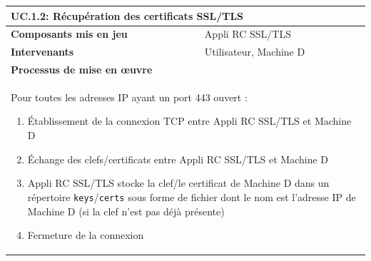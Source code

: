 \documentclass[a4paper,11pt,french]{article}
\begin{document}
\begin{center}

	\begin{tabularx}{16cm}{|l|X|}
	\hline
	\multicolumn{2}{|l|}{\textbf{UC.1.2: Récupération des certificats SSL/TLS}}\\
	\hline
	\textbf{Composants mis en jeu} & Appli RC SSL/TLS\\
	\hline
	\textbf{Intervenants} & Utilisateur, Machine D\\
	\hline
	\multicolumn{2}{|l|}{\textbf{Processus de mise en \oe uvre}}\\
	\hline
	\multicolumn{2}{|p{15cm}|}{
    Pour toutes les adresses IP ayant un port 443 ouvert :
	\begin{enumerate}
	\item Établissement de la connexion TCP entre Appli RC SSL/TLS et Machine D
	\item Échange des clefs/certificats entre Appli RC SSL/TLS et Machine D
	\item Appli RC SSL/TLS stocke la clef/le certificat de Machine D dans un répertoire \verb+keys+/\verb+certs+ sous forme de fichier dont le nom est l'adresse IP de Machine D (si la clef n'est pas déjà présente)
	\item Fermeture de la connexion
	\end{enumerate}
	}\\
	\hline
	\end{tabularx}
\end{center}

\begin{center}

\end{center}
\end{document}
